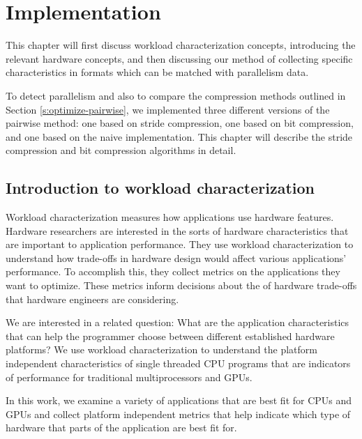 \documentclass[12pt,twoside]{reedthesis}
\begin{document}
		
		
\chapter{Implementation}


	This chapter will first discuss workload characterization concepts, introducing the relevant hardware concepts, and then discussing our method of collecting specific characteristics in formats which can be matched with parallelism data. 
	
	To detect parallelism and also to compare the compression methods outlined in Section \ref{s:optimize-pairwise}, we implemented three different versions of the pairwise method: one based on stride compression, one based on bit compression, and one based on the naive implementation. This chapter will describe the stride compression and bit compression algorithms in detail. 
	

	\section{Introduction to workload characterization}
		\label{s:workload-characht}
	
		Workload characterization measures how applications use hardware features. %
		Hardware researchers are interested in the sorts of hardware characteristics that are important to application performance. They use workload characterization to understand how trade-offs in hardware design would affect various applications' performance. To accomplish this, they collect metrics on the applications they want to optimize. These metrics inform decisions about the of hardware trade-offs that hardware engineers are considering. 
		
		We are interested in a related question: What are the application characteristics that can help the programmer choose between different established hardware platforms? We use workload characterization to understand the platform independent characteristics of single threaded CPU programs that are indicators of performance for traditional multiprocessors and GPUs. 
		
		In this work, we examine a variety of applications that are best fit for CPUs and GPUs and collect platform independent metrics that help indicate which type of hardware that parts of the application are best fit for. %
		
\end{document}
